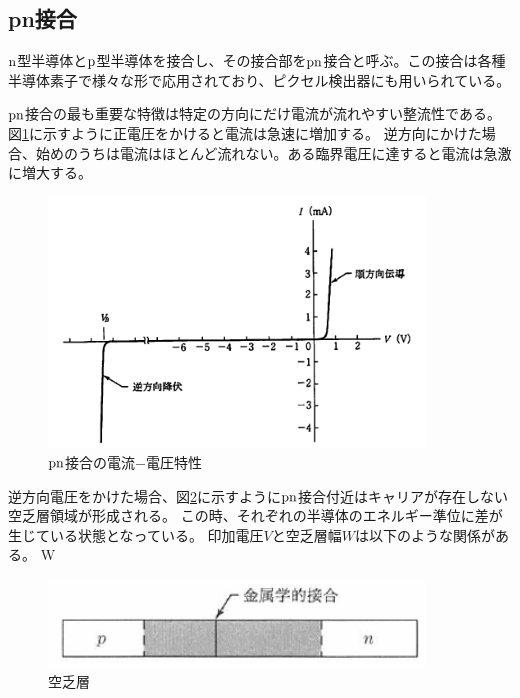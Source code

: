 \subsection{pn接合}
$\rm{n}$型半導体と$\rm{p}$型半導体を接合し、その接合部を$\rm{pn}$接合と呼ぶ。この接合は各種半導体素子で様々な形で応用されており、ピクセル検出器にも用いられている。

$\rm{pn}$接合の最も重要な特徴は特定の方向にだけ電流が流れやすい整流性である。図\ref{pn_iv}に示すように正電圧をかけると電流は急速に増加する。
逆方向にかけた場合、始めのうちは電流はほとんど流れない。ある臨界電圧に達すると電流は急激に増大する。

\begin{figure}[bpt]\centering
\includegraphics[width=10cm]{pn_iv}
\caption[$\rm{pn}$接合の電流$-$電圧特性]{$\rm{pn}$接合の電流$-$電圧特性\cite{2-1}}
\label{pn_iv}
\end{figure}

逆方向電圧をかけた場合、図\ref{depletion_field}に示すように$\rm{pn}$接合付近はキャリアが存在しない空乏層領域が形成される。
この時、それぞれの半導体のエネルギー準位に差が生じている状態となっている。
印加電圧$V$と空乏層幅$W$は以下のような関係がある。
\bbb
W \propto {}
\eee

\begin{figure}[bpt]\centering
\includegraphics[width=10cm]{depletion_field}
\caption[空乏層]{空乏層\cite{2-1}}
\label{depletion_field}
\end{figure}

